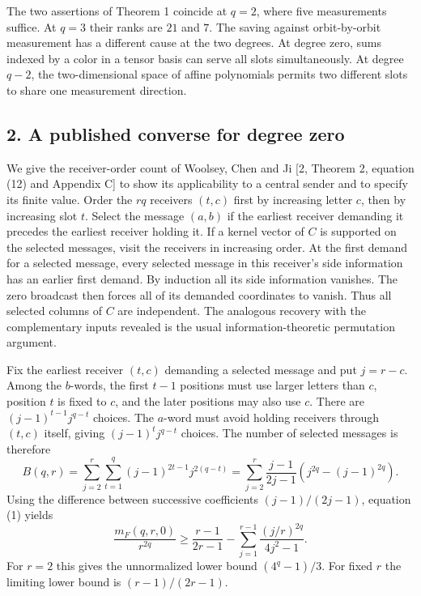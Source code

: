 \documentclass[
  10pt,
]{article}
\begin{document}
The two assertions of Theorem 1 coincide at \(q=2\), where five
measurements suffice. At \(q=3\) their ranks are \(21\) and \(7\). The
saving against orbit-by-orbit measurement has a different cause at the
two degrees. At degree zero, sums indexed by a color in a tensor basis
can serve all slots simultaneously. At degree \(q-2\), the
two-dimensional space of affine polynomials permits two different slots
to share one measurement direction.

\subsection{2. A published converse for degree
zero}\label{a-published-converse-for-degree-zero}

We give the receiver-order count of Woolsey, Chen and Ji {[}2, Theorem
2, equation (12) and Appendix C{]} to show its applicability to a
central sender and to specify its finite value. Order the \(rq\)
receivers \((t,c)\) first by increasing letter \(c\), then by increasing
slot \(t\). Select the message \((a,b)\) if the earliest receiver
demanding it precedes the earliest receiver holding it. If a kernel
vector of \(C\) is supported on the selected messages, visit the
receivers in increasing order. At the first demand for a selected
message, every selected message in this receiver's side information has
an earlier first demand. By induction all its side information vanishes.
The zero broadcast then forces all of its demanded coordinates to
vanish. Thus all selected columns of \(C\) are independent. The
analogous recovery with the complementary inputs revealed is the usual
information-theoretic permutation argument.

Fix the earliest receiver \((t,c)\) demanding a selected message and put
\(j=r-c\). Among the \(b\)-words, the first \(t-1\) positions must use
larger letters than \(c\), position \(t\) is fixed to \(c\), and the
later positions may also use \(c\). There are \((j-1)^{t-1}j^{q-t}\)
choices. The \(a\)-word must avoid holding receivers through \((t,c)\)
itself, giving \((j-1)^t j^{q-t}\) choices. The number of selected
messages is therefore \[
 B(q,r)=
 \sum_{j=2}^r\sum_{t=1}^q(j-1)^{2t-1}j^{2(q-t)}
 =
 \sum_{j=2}^r\frac{j-1}{2j-1}
       \left(j^{2q}-(j-1)^{2q}\right).
 \tag{1}
\] Using the difference between successive coefficients
\((j-1)/(2j-1)\), equation (1) yields \[
 \frac{m_F(q,r,0)}{r^{2q}}\ge
 \frac{r-1}{2r-1}
   -\sum_{j=1}^{r-1}\frac{(j/r)^{2q}}{4j^2-1}.
 \tag{2}
\] For \(r=2\) this gives the unnormalized lower bound \((4^q-1)/3\).
For fixed \(r\) the limiting lower bound is \((r-1)/(2r-1)\).
\end{document}
